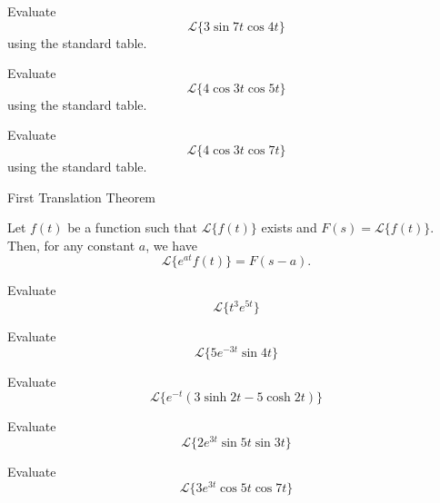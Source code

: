 \documentclass[12pt, a4paper]{article}
\begin{document}
\begin{problem}
	Evaluate \[\mathcal{L}\{3\sin 7t \cos 4t\}\] using the standard table.
\end{problem}

\clearpage

\begin{problem}
	Evaluate \[\mathcal{L}\{4\cos 3t \cos 5t\}\] using the standard table.
\end{problem}

\clearpage

\begin{problem}
	Evaluate \[\mathcal{L}\{4\cos 3t \cos 7t\}\] using the standard table.
\end{problem}

\clearpage

\begin{heading}
	First Translation Theorem
\end{heading}

\vspace{10pt}
\begin{theorem}
	Let $f(t)$ be a function such that $\mathcal{L}\{f(t)\}$ exists and $F(s) = \mathcal{L}\{f(t)\}$. Then, for any constant $a$, we have
	\[
	\mathcal{L}\{e^{at}f(t)\} = F(s-a).
	\]
\end{theorem}

\clearpage

\begin{problem}
	Evaluate \[\mathcal{L}\{t^3	e^{5t}\}\] 
\end{problem}

\clearpage

\begin{problem}
	Evaluate \[\mathcal{L}\{5e^{-3t}\sin 4t\}\] 
\end{problem}

\clearpage

\begin{problem}
	Evaluate \[\mathcal{L}\{e^{-t}(3\sinh 2t-5\cosh 2t)\}\] 
\end{problem}

\clearpage

\begin{problem}
	Evaluate \[\mathcal{L}\{2e^{3t} \sin 5t \sin 3t\}\] 
\end{problem}

\clearpage

\begin{problem}
	Evaluate \[\mathcal{L}\{3e^{3t} \cos 5t \cos 7t\}\] 
\end{problem}
\end{document}
